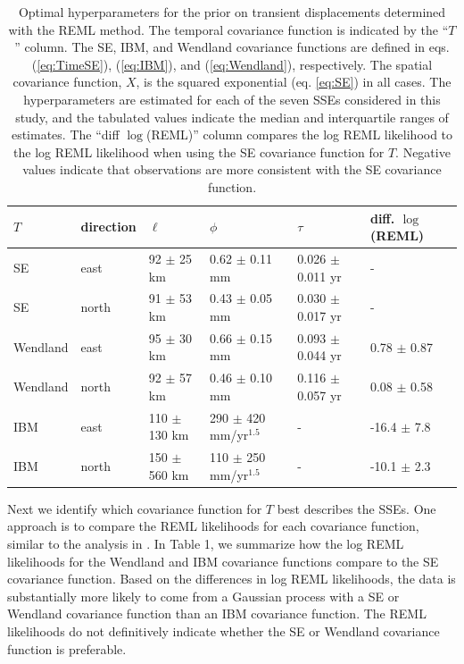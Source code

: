 \documentclass[extra,mreferee]{gji}
\begin{document}
\begin{table}\label{tab:Parameters}
\caption{
Optimal hyperparameters for the prior on transient displacements
determined with the REML method. The temporal covariance function is
indicated by the ``$T$'' column. The SE, IBM, and Wendland covariance
functions are defined in eqs. (\ref{eq:TimeSE}), (\ref{eq:IBM}), and
(\ref{eq:Wendland}), respectively. The spatial covariance function,
$X$, is the squared exponential (eq. \ref{eq:SE}) in all cases. The
hyperparameters are estimated for each of the seven SSEs considered in
this study, and the tabulated values indicate the median and
interquartile ranges of estimates. The ``diff $\log$(REML)'' column
compares the log REML likelihood to the log REML likelihood when using
the SE covariance function for $T$. Negative values indicate that
observations are more consistent with the SE covariance function.
} 
\begin{tabular} {l l l l l l}
$T$ & direction & $\ell$  & $\phi$   & $\tau$  & diff. $\log$(REML) \\ \hline
SE & east   & 92 $\pm$ 25 km  & 0.62 $\pm$ 0.11 mm  & 0.026 $\pm$ 0.011 yr  &  - \\
SE & north  & 91 $\pm$ 53 km  & 0.43 $\pm$ 0.05 mm  & 0.030 $\pm$ 0.017 yr  &  - \\
Wendland & east   & 95 $\pm$ 30 km  & 0.66 $\pm$ 0.15 mm  & 0.093 $\pm$ 0.044 yr &  0.78 $\pm$ 0.87 \\
Wendland & north  & 92 $\pm$ 57 km  & 0.46 $\pm$ 0.10 mm  & 0.116 $\pm$ 0.057 yr &  0.08 $\pm$ 0.58 \\
IBM & east   & 110 $\pm$ 130 km & 290 $\pm$ 420 mm/yr$^{1.5}$  & -          & -16.4 $\pm$ 7.8 \\
IBM & north  & 150 $\pm$ 560 km & 110 $\pm$ 250 mm/yr$^{1.5}$ & -           & -10.1 $\pm$ 2.3 \\
\end{tabular}
\end{table}

Next we identify which covariance function for $T$ best describes the
SSEs. One approach is to compare the REML likelihoods for each
covariance function, similar to the analysis in \citet{Langbein2004}.
In Table 1, we summarize how the log REML likelihoods for the Wendland
and IBM covariance functions compare to the SE covariance function.
Based on the differences in log REML likelihoods, the data is
substantially more likely to come from a Gaussian process with a SE or
Wendland covariance function than an IBM covariance function. The REML
likelihoods do not definitively indicate whether the SE or Wendland
covariance function is preferable.
\end{document}
